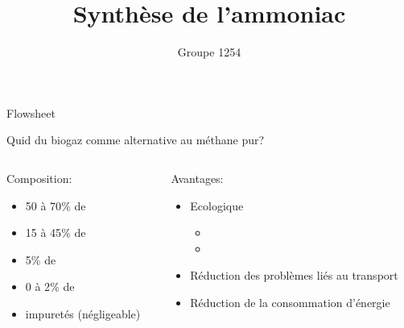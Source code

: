 \documentclass{beamer}
\begin{document}
\title{Synthèse de l'ammoniac}
\author{Groupe 1254}
\date{}
\maketitle
\begin{frame}{Flowsheet}

\begin{center}
\resizebox{6cm}{6cm}{
	}
\end{center}
\end{frame}

\begin{frame}{Quid du biogaz comme alternative au méthane pur?}
	\begin{columns}
		\begin{column}{0.40\textwidth}
		Composition:
			\begin{itemize}
			\item 50 à \unit{70}{\%} de 
			\item 15 à \unit{45}{\%} de 
			\item  \unit{5}{\%} de 
			\item 0 à \unit{2}{\%} de 
			\item impuretés (négligeable)
			\end{itemize}
		\end{column}
		\begin{column}{0.40\textwidth}
		Avantages:
			\begin{itemize}
			\item Ecologique 
				\begin{itemize}
				\item {}
				\item {}
				\end{itemize}
			\item Réduction des problèmes liés au transport
			\item Réduction de la consommation d'énergie
			\end{itemize}
		\end{column}
	\end{columns}
\end{frame}
\end{document}
